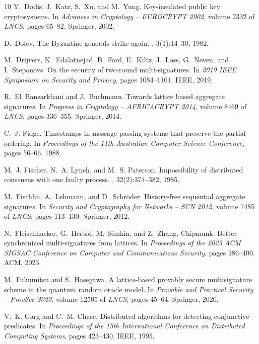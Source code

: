 \documentclass[11pt]{article}
\theoremstyle{definition}
\begin{document}
\begin{thebibliography}{10}
Y.~Dodis, J.~Katz, S.~Xu, and M.~Yung.
\newblock Key-insulated public key cryptosystems.
\newblock In {\em Advances in Cryptology -- EUROCRYPT 2002}, volume 2332 of
  {\em LNCS}, pages 65--82. Springer, 2002.

D.~Dolev.
\newblock The {Byzantine} generals strike again.
, 3(1):14--30, 1982.

M.~Drijvers, K.~Edalatnejad, B.~Ford, E.~Kiltz, J.~Loss, G.~Neven, and
  I.~Stepanovs.
\newblock On the security of two-round multi-signatures.
\newblock In {\em 2019 IEEE Symposium on Security and Privacy}, pages
  1084--1101. IEEE, 2019.

R.~El~Bansarkhani and J.~Buchmann.
\newblock Towards lattice based aggregate signatures.
\newblock In {\em Progress in Cryptology -- AFRICACRYPT 2014}, volume 8469 of
  {\em LNCS}, pages 336--355. Springer, 2014.

C.~J. Fidge.
\newblock Timestamps in message-passing systems that preserve the partial
  ordering.
\newblock In {\em Proceedings of the 11th Australian Computer Science
  Conference}, pages 56--66, 1988.

M.~J. Fischer, N.~A. Lynch, and M.~S. Paterson.
\newblock Impossibility of distributed consensus with one faulty process.
, 32(2):374--382, 1985.

M.~Fischlin, A.~Lehmann, and D.~Schr{\"o}der.
\newblock History-free sequential aggregate signatures.
\newblock In {\em Security and Cryptography for Networks -- SCN 2012}, volume
  7485 of {\em LNCS}, pages 113--130. Springer, 2012.

N.~Fleischhacker, G.~Herold, M.~Simkin, and Z.~Zhang.
\newblock Chipmunk: Better synchronized multi-signatures from lattices.
\newblock In {\em Proceedings of the 2023 ACM SIGSAC Conference on Computer and
  Communications Security}, pages 386--400. ACM, 2023.

M.~Fukumitsu and S.~Hasegawa.
\newblock A lattice-based provably secure multisignature scheme in the quantum
  random oracle model.
\newblock In {\em Provable and Practical Security -- ProvSec 2020}, volume
  12505 of {\em LNCS}, pages 45--64. Springer, 2020.

V.~K. Garg and C.~M. Chase.
\newblock Distributed algorithms for detecting conjunctive predicates.
\newblock In {\em Proceedings of the 15th International Conference on
  Distributed Computing Systems}, pages 423--430. IEEE, 1995.


\end{thebibliography}
\end{document}

